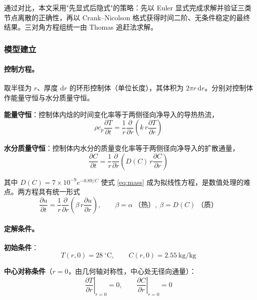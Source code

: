 \documentclass[12pt,a4paper]{ctexart}
\newcommand{\dd}{\mathrm{d}}
\begin{document}
通过对比，本文采用"先显式后隐式"的策略：先以 Euler 显式完成求解并验证三类节点离散的正确性，再以 Crank--Nicolson 格式获得时间二阶、无条件稳定的最终结果。三对角方程组统一由 Thomas 追赶法求解。

\subsubsection{模型建立}
\paragraph{控制方程。} 取半径为 $r$、厚度 $\dd r$ 的环形控制体（单位长度），其体积为 $2\pi r\,\dd r$。分别对控制体作能量守恒与水分质量守恒。

\textbf{能量守恒}：控制体内焓的时间变化率等于两侧径向净导入的导热热流，
\begin{equation}
\rho c_p\frac{\partial T}{\partial t}=\frac{1}{r}\frac{\partial}{\partial r}\!\left(k\,r\frac{\partial T}{\partial r}\right)
\label{eq:heat}
\end{equation}

\textbf{水分质量守恒}：控制体内水分的质量变化率等于两侧径向净导入的扩散通量，
\begin{equation}
\frac{\partial C}{\partial t}=\frac{1}{r}\frac{\partial}{\partial r}\!\left(D(C)\,r\frac{\partial C}{\partial r}\right)
\label{eq:mass}
\end{equation}

其中 $D(C)=7\times10^{-9}e^{-0.89/C}$ 使式 \eqref{eq:mass} 成为拟线性方程，是数值处理的难点。两方程具有统一形式
\begin{equation}
\frac{\partial u}{\partial t}=\frac{1}{r}\frac{\partial}{\partial r}\!\left(\beta\,r\frac{\partial u}{\partial r}\right),\qquad
\beta=\alpha\ \text{（热）},\ \beta=D(C)\ \text{（质）}
\label{eq:unified}
\end{equation}

\paragraph{定解条件。}
\textbf{初始条件}：
\begin{equation}
T(r,0)=28\ ^\circ\mathrm{C},\qquad C(r,0)=2.55\ \mathrm{kg/kg}
\label{eq:init}
\end{equation}

\textbf{中心对称条件}（$r=0$，由几何轴对称性，中心处无径向通量）：
\begin{equation}
\left.\frac{\partial T}{\partial r}\right|_{r=0}=0,\qquad
\left.\frac{\partial C}{\partial r}\right|_{r=0}=0
\label{eq:center}
\end{equation}
\end{document}
